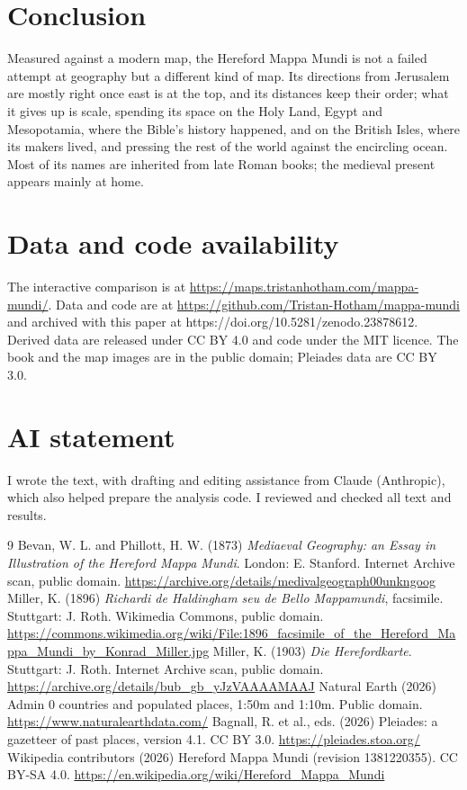 \documentclass[11pt,a4paper]{article}
\begin{document}
\section{Conclusion}
Measured against a modern map, the Hereford Mappa Mundi is not a failed attempt at geography but a different kind of map. Its directions from Jerusalem are mostly right once east is at the top, and its distances keep their order; what it gives up is scale, spending its space on the Holy Land, Egypt and Mesopotamia, where the Bible's history happened, and on the British Isles, where its makers lived, and pressing the rest of the world against the encircling ocean. Most of its names are inherited from late Roman books; the medieval present appears mainly at home.

\section*{Data and code availability}
The interactive comparison is at \url{https://maps.tristanhotham.com/mappa-mundi/}. Data and code are at \url{https://github.com/Tristan-Hotham/mappa-mundi} and archived with this paper at https://doi.org/10.5281/zenodo.23878612. Derived data are released under CC BY 4.0 and code under the MIT licence. The book and the map images are in the public domain; Pleiades data are CC BY 3.0.

\section*{AI statement}
I wrote the text, with drafting and editing assistance from Claude (Anthropic), which also helped prepare the analysis code. I reviewed and checked all text and results.

\begin{thebibliography}{9}
 Bevan, W. L. and Phillott, H. W. (1873) \textit{Mediaeval Geography: an Essay in Illustration of the Hereford Mappa Mundi}. London: E. Stanford. Internet Archive scan, public domain. \url{https://archive.org/details/medivalgeograph00unkngoog}
 Miller, K. (1896) \textit{Richardi de Haldingham seu de Bello Mappamundi}, facsimile. Stuttgart: J. Roth. Wikimedia Commons, public domain. \url{https://commons.wikimedia.org/wiki/File:1896_facsimile_of_the_Hereford_Mappa_Mundi_by_Konrad_Miller.jpg}
 Miller, K. (1903) \textit{Die Herefordkarte}. Stuttgart: J. Roth. Internet Archive scan, public domain. \url{https://archive.org/details/bub_gb_yJzVAAAAMAAJ}
 Natural Earth (2026) Admin 0 countries and populated places, 1:50m and 1:10m. Public domain. \url{https://www.naturalearthdata.com/}
 Bagnall, R. et al., eds. (2026) Pleiades: a gazetteer of past places, version 4.1. CC BY 3.0. \url{https://pleiades.stoa.org/}
 Wikipedia contributors (2026) Hereford Mappa Mundi (revision 1381220355). CC BY-SA 4.0. \url{https://en.wikipedia.org/wiki/Hereford_Mappa_Mundi}
\end{thebibliography}
\end{document}
